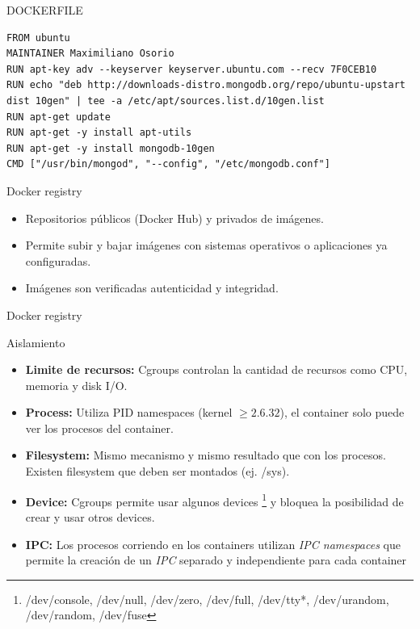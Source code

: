 \documentclass[compress]{beamer}
\begin{document}
\begin{frame}[containsverbatim]{DOCKERFILE}
\begin{lstlisting}
FROM ubuntu
MAINTAINER Maximiliano Osorio
RUN apt-key adv --keyserver keyserver.ubuntu.com --recv 7F0CEB10
RUN echo "deb http://downloads-distro.mongodb.org/repo/ubuntu-upstart dist 10gen" | tee -a /etc/apt/sources.list.d/10gen.list
RUN apt-get update
RUN apt-get -y install apt-utils
RUN apt-get -y install mongodb-10gen
CMD ["/usr/bin/mongod", "--config", "/etc/mongodb.conf"] 
\end{lstlisting}
\end{frame}




\begin{frame}{Docker registry}
\begin{itemize}
	\item Repositorios públicos (Docker Hub) y privados de imágenes.
	\item Permite subir y bajar imágenes con sistemas operativos o aplicaciones ya configuradas.
	\item Imágenes son verificadas autenticidad y integridad.	
\end{itemize}
\end{frame}


\begin{frame}{Docker registry}

\begin{figure}[H]
  \centering
    \label{fig:dynamic}
\end{figure}	
\end{frame}


\begin{frame}{Aislamiento}
	\begin{itemize}
		\item \textbf{Limite de recursos:}  Cgroups controlan la cantidad de recursos como CPU, memoria y disk I/O.
		\item \textbf{Process:} Utiliza PID namespaces (kernel \(\geq 2.6.32\)), el container solo puede ver los procesos del container.
		\item \textbf{Filesystem:} Mismo mecanismo y mismo resultado que con los procesos. Existen filesystem que deben ser montados (ej. /sys).
		\item \textbf{Device:} Cgroups permite usar algunos devices \footnote{/dev/console, /dev/null, /dev/zero, /dev/full, /dev/tty*, /dev/urandom, /dev/random, /dev/fuse} y bloquea la posibilidad de crear y usar otros devices.
		\item \textbf{IPC:} Los procesos corriendo en los containers utilizan \textit{IPC namespaces} que permite la creación de un \textit{IPC} separado y independiente para cada container 
	\end{itemize}
\end{frame}
\end{document}
